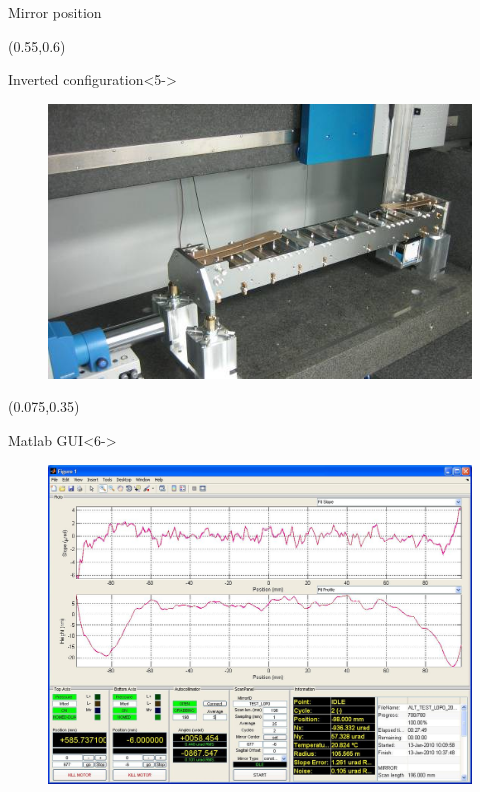 \documentclass{beamer}
\begin{document}
\begin{frame}
\begin{textblock*}{45mm}
\begin{exampleblock}{Mirror position}
\begin{figure}
            \end{figure}
        \end{exampleblock}
    \end{textblock*}
    \begin{textblock*}{45mm}(0.55\textwidth,0.6\textheight)
        \begin{exampleblock}{Inverted configuration}<5->
            \begin{figure}
                \includegraphics[width=\textwidth]{imgs/alba/laop/04_detall_LTP_inverted_configuration.jpg}
            \end{figure}
        \end{exampleblock}
    \end{textblock*}
    \begin{textblock*}{45mm}(0.075\textwidth,0.35\textheight)
        \begin{block}{Matlab GUI}<6->
            \begin{figure}
                \includegraphics[width=\textwidth]{imgs/alba/laop/05_ltp_matlabgui.jpg}

\end{figure}
\end{block}
\end{textblock*}
\end{frame}
\end{document}
